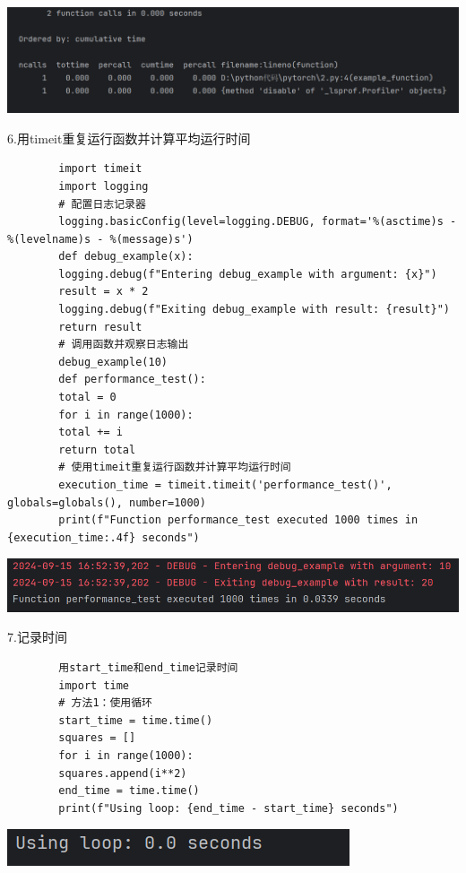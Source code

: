 \documentclass{article}
\begin{document}
	\noindent
	\begin{minipage}{\linewidth}
		\centering
		\includegraphics[width=0.5\linewidth]{example17.png}
		\label{fig:example}
	\end{minipage}
	
	6.用timeit重复运行函数并计算平均运行时间
	\begin{verbatim}
		import timeit
		import logging
		# 配置日志记录器
		logging.basicConfig(level=logging.DEBUG, format='%(asctime)s - %(levelname)s - %(message)s')
		def debug_example(x):
		logging.debug(f"Entering debug_example with argument: {x}")
		result = x * 2
		logging.debug(f"Exiting debug_example with result: {result}")
		return result
		# 调用函数并观察日志输出
		debug_example(10)
		def performance_test():
		total = 0
		for i in range(1000):
		total += i
		return total
		# 使用timeit重复运行函数并计算平均运行时间
		execution_time = timeit.timeit('performance_test()', globals=globals(), number=1000)
		print(f"Function performance_test executed 1000 times in {execution_time:.4f} seconds")
	\end{verbatim}
	
	\noindent
	\begin{minipage}{\linewidth}
		\centering
		\includegraphics[width=0.5\linewidth]{example18.png}
		\label{fig:example}
	\end{minipage}
	
	7.记录时间
	\begin{verbatim}
		用start_time和end_time记录时间
		import time
		# 方法1：使用循环
		start_time = time.time()
		squares = []
		for i in range(1000):
		squares.append(i**2)
		end_time = time.time()
		print(f"Using loop: {end_time - start_time} seconds")       
	\end{verbatim}
	
	\noindent
	\begin{minipage}{\linewidth}
		\centering
		\includegraphics[width=0.5\linewidth]{example19.png}
		\label{fig:example}
	\end{minipage}
	
\end{document}
